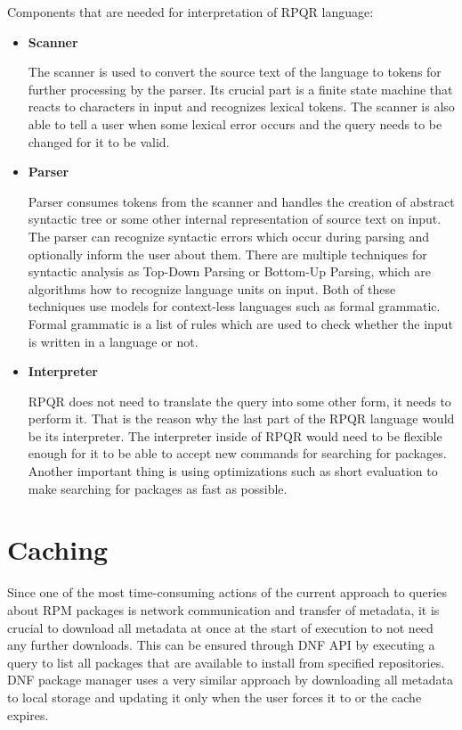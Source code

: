 Components that are needed for interpretation of RPQR language:
\begin{itemize}
  \item \textbf{Scanner}

  The scanner is used to convert the source text of the language to tokens for further processing by the parser.
  Its crucial part is a finite state machine that reacts to characters in input and recognizes lexical
  tokens. The scanner is also able to tell a user when some lexical error occurs and the query needs to be
  changed for it to be valid.
  
  \item \textbf{Parser}
  
  Parser consumes tokens from the scanner and handles the creation of abstract syntactic tree or some other
  internal representation of source text on input. The parser can recognize syntactic errors
  which occur during parsing and optionally inform the user about them. There are multiple techniques
  for syntactic analysis as Top-Down Parsing or Bottom-Up Parsing, which are algorithms
  how to recognize language units on input. Both of these techniques use models for context-less
  languages such as formal grammatic. Formal grammatic is a list of rules which are used to check
  whether the input is written in a language or not.

  \item \textbf{Interpreter}
  
  RPQR does not need to translate the query into some other form, it needs to perform it. That is the
  reason why the last part of the RPQR language would be its interpreter. The interpreter inside of RPQR would need to be
  flexible enough for it to be able to accept new commands for searching for packages. Another important thing is using optimizations such as short evaluation to make searching for packages
  as fast as possible.
\end{itemize}

\section{Caching}
Since one of the most time-consuming actions of the current approach to queries about RPM packages is
network communication and transfer of metadata, it is crucial to download all metadata at once at
the start of execution to not need any further downloads. This can be ensured through DNF API by
executing a query to list all packages that are available to install from specified repositories.
DNF package manager uses a very similar approach by downloading all metadata to local storage and
updating it only when the user forces it to or the cache expires.


